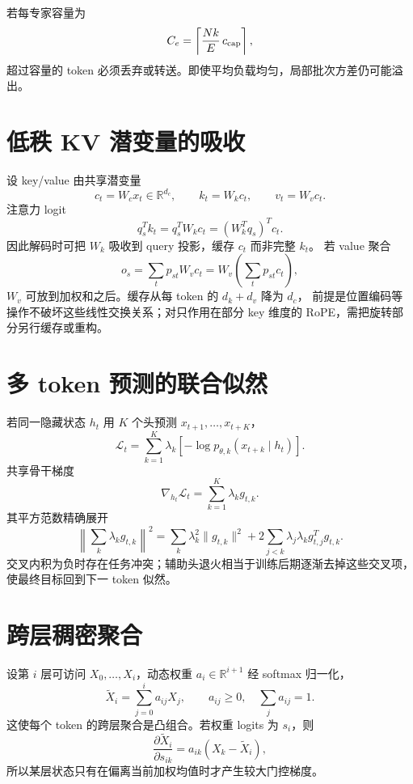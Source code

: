 \documentclass[11pt]{article}
\numberwithin{equation}{section}
\newcommand{\R}{\mathbb{R}}
\newcommand{\1}{\mathbf{1}}
\newcommand{\cL}{\mathcal{L}}
\begin{document}
若每专家容量为
\begin{equation}
 C_e=\left\lceil\frac{Nk}{E}\,c_{\rm cap}\right\rceil,
\end{equation}
超过容量的 token 必须丢弃或转送。即使平均负载均匀，局部批次方差仍可能溢出。

\section{低秩 KV 潜变量的吸收}

设 key/value 由共享潜变量
\begin{equation}
 c_t=W_cx_t\in\R^{d_c},\qquad
 k_t=W_kc_t,\qquad v_t=W_vc_t.
\end{equation}
注意力 logit
\begin{equation}
 q_s^Tk_t=q_s^TW_kc_t=(W_k^Tq_s)^Tc_t.
\end{equation}
因此解码时可把 $W_k$ 吸收到 query 投影，缓存 $c_t$ 而非完整 $k_t$。
若 value 聚合
\begin{equation}
 o_s=\sum_tp_{st}W_vc_t=W_v\left(\sum_tp_{st}c_t\right),
\end{equation}
$W_v$ 可放到加权和之后。缓存从每 token 的 $d_k+d_v$ 降为 $d_c$，
前提是位置编码等操作不破坏这些线性交换关系；对只作用在部分 key 维度的 RoPE，需把旋转部分另行缓存或重构。

\section{多 token 预测的联合似然}

若同一隐藏状态 $h_t$ 用 $K$ 个头预测 $x_{t+1},\ldots,x_{t+K}$，
\begin{equation}
 \cL_t=\sum_{k=1}^{K}\lambda_k
 [-\log p_{\theta,k}(x_{t+k}\mid h_t)].
\end{equation}
共享骨干梯度
\begin{equation}
 \nabla_{h_t}\cL_t=\sum_{k=1}^{K}\lambda_k g_{t,k}.
\end{equation}
其平方范数精确展开
\begin{equation}
 \left\|\sum_k\lambda_kg_{t,k}\right\|^2
 =\sum_k\lambda_k^2\|g_{t,k}\|^2
 +2\sum_{j<k}\lambda_j\lambda_k g_{t,j}^Tg_{t,k}.
\end{equation}
交叉内积为负时存在任务冲突；辅助头退火相当于训练后期逐渐去掉这些交叉项，
使最终目标回到下一 token 似然。

\section{跨层稠密聚合}
设第 $i$ 层可访问 $X_0,\ldots,X_i$，动态权重 $a_i\in\R^{i+1}$ 经 softmax 归一化，
\begin{equation}
  \tilde X_i=\sum_{j=0}^{i}a_{ij}X_j,
  \qquad a_{ij}\ge0,\quad\sum_ja_{ij}=1.
\end{equation}
这使每个 token 的跨层聚合是凸组合。若权重 logits 为 $s_i$，则
\begin{equation}
  \frac{\partial\tilde X_i}{\partial s_{ik}}
  =a_{ik}(X_k-\tilde X_i),
\end{equation}
所以某层状态只有在偏离当前加权均值时才产生较大门控梯度。
\end{document}
